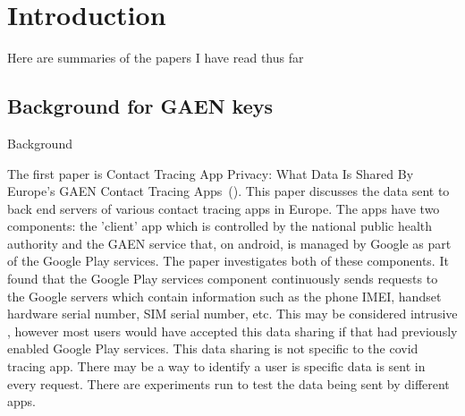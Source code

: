 \chapter{Introduction}

Here are summaries of the papers I have read thus far

\section{Background for GAEN keys}
\label{sec:BackgroundGAENKeys}

Background

The first paper is Contact Tracing App Privacy: What Data Is Shared
By Europe’s GAEN Contact Tracing Apps~(\cite{9488728}). This paper discusses the data sent to back end servers of various contact tracing apps in Europe. The apps have two components: the 'client' app which is controlled by the national public health authority and the GAEN service that, on android, is managed by Google as part of the Google Play services. The paper investigates both of these components. It found that the Google Play services component continuously sends requests to the Google servers which contain information such as the phone IMEI, handset hardware serial number, SIM serial number, etc. This may be considered intrusive , however most users would have accepted this data sharing if that had previously enabled Google Play services. This data sharing is not specific to the covid tracing app. There may be a way to identify a user is  specific data is sent in every request. There are experiments run to test the data being sent by different apps. \par

